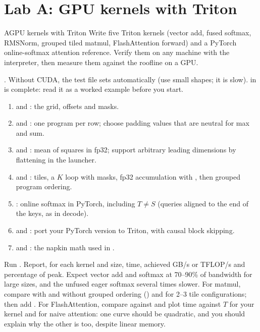 \section{Lab A: GPU kernels with Triton}\label{sec:triton:lab}
\begin{labbox}{A}{GPU kernels with Triton}
Write five Triton kernels (vector add, fused softmax, RMSNorm, grouped tiled matmul,
FlashAttention forward) and a PyTorch online-softmax attention reference. Verify them on
any machine with the interpreter, then measure them against the roofline on a GPU.

. Without CUDA,
the test file sets  automatically (use small shapes; it is
slow).  in  is complete: read it as a worked
example before you start.

\begin{enumerate}
  \item {} and : the grid, offsets and masks.
  \item {} and : one program per row; choose
        padding values that are neutral for max and sum.
  \item {} and : mean of squares in fp32; support
        arbitrary leading dimensions by flattening in the launcher.
  \item {} and : tiles, a $K$ loop with masks, fp32
        accumulation with , then grouped program ordering.
  \item {}: online softmax in PyTorch, including
        $T\neq S$ (queries aligned to the end of the keys, as in decode).
  \item {} and : port your PyTorch version
        to Triton, with causal block skipping.
  \item {} and : the napkin math used in
        .
\end{enumerate}

Run . Report, for each kernel and size,
time, achieved GB/s or TFLOP/s and percentage of peak. Expect vector add and softmax at
70--90\% of bandwidth for large sizes, and the unfused eager softmax several times
slower. For matmul, compare with and without grouped ordering () and
for 2--3 tile configurations; then add . For FlashAttention,
compare against  and plot time against $T$ for
your kernel and for naive attention: one curve should be quadratic, and you should
explain why the other is too, despite linear memory.


\end{labbox}
